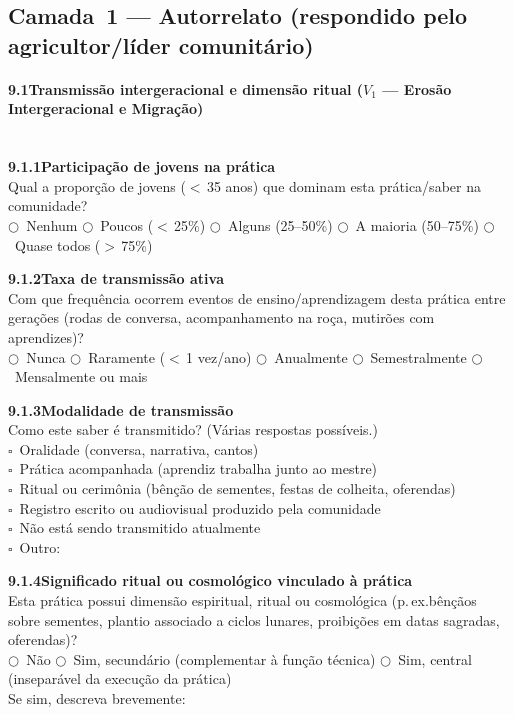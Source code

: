 \subsection{Camada~1 --- Autorrelato (respondido pelo agricultor/líder comunitário)}

\paragraph{9.1\quad Transmissão intergeracional e dimensão ritual ($V_1$ --- Erosão Intergeracional e Migração)}~\\[4pt]

\noindent\textbf{9.1.1\quad Participação de jovens na prática}\\[2pt]
Qual a proporção de jovens ($<$\,35 anos) que dominam esta prática/saber na comunidade?\\
$\bigcirc$~Nenhum \quad $\bigcirc$~Poucos ($<$\,25\%) \quad $\bigcirc$~Alguns (25--50\%) \quad $\bigcirc$~A maioria (50--75\%) \quad $\bigcirc$~Quase todos ($>$\,75\%)

\medskip\noindent\textbf{9.1.2\quad Taxa de transmissão ativa}\\[2pt]
Com que frequência ocorrem eventos de ensino/aprendizagem desta prática entre gerações (rodas de conversa, acompanhamento na roça, mutirões com aprendizes)?\\
$\bigcirc$~Nunca \quad $\bigcirc$~Raramente ($<$\,1 vez/ano) \quad $\bigcirc$~Anualmente \quad $\bigcirc$~Semestralmente \quad $\bigcirc$~Mensalmente ou mais

\medskip\noindent\textbf{9.1.3\quad Modalidade de transmissão}\\[2pt]
Como este saber é transmitido? (Várias respostas possíveis.)\\
$\square$~Oralidade (conversa, narrativa, cantos)\\
$\square$~Prática acompanhada (aprendiz trabalha junto ao mestre)\\
$\square$~Ritual ou cerimônia (bênção de sementes, festas de colheita, oferendas)\\
$\square$~Registro escrito ou audiovisual produzido pela comunidade\\
$\square$~Não está sendo transmitido atualmente\\
$\square$~Outro: \dotfill

\medskip\noindent\textbf{9.1.4\quad Significado ritual ou cosmológico vinculado à prática}\\[2pt]
Esta prática possui dimensão espiritual, ritual ou cosmológica (p.\,ex.\@ bênçãos sobre sementes, plantio associado a ciclos lunares, proibições em datas sagradas, oferendas)?\\
$\bigcirc$~Não \quad $\bigcirc$~Sim, secundário (complementar à função técnica) \quad $\bigcirc$~Sim, central (inseparável da execução da prática)\\[2pt]
Se sim, descreva brevemente: \dotfill\\[2pt]\dotfill

